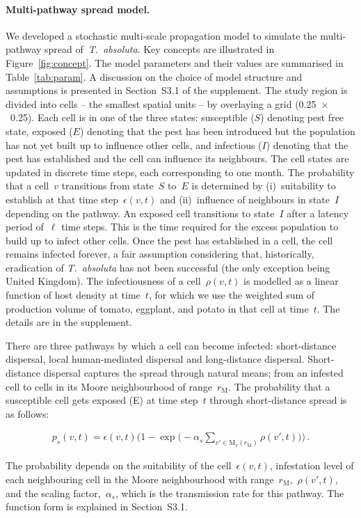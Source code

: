 \documentclass[11pt]{article}
\newcommand{\tuta}{\emph{T.~absoluta}}
\newcommand{\infest}{\rho}
\newcommand{\suitable}{\epsilon}
\newcommand{\pshort}{p_s}
\newcommand{\asd}{\alpha_s}
\newcommand{\moore}{\mathrm{M}}
\newcommand{\mooreRange}{r_\mathrm{M}}
\theoremstyle{definition}
\begin{document}
\paragraph{Multi-pathway spread model.} We developed a stochastic
multi-scale propagation model to simulate the multi-pathway spread
of~\tuta{}. Key concepts are illustrated in Figure~\ref{fig:concept}. The
model parameters and their values are summarised in Table~\ref{tab:param}.
A discussion on the choice of model structure and assumptions is presented
in Section~S3.1 of the supplement. The study region
is divided into cells -- the smallest spatial units -- by overlaying a grid
(0.25\textdegree~$\times$~0.25\textdegree). Each cell is in one of the
three states: susceptible ($S$) denoting pest free state, exposed ($E$)
denoting that the pest has been introduced but the population has not yet
built up to influence other cells, and infectious ($I$) denoting that the
pest has established and the cell can influence its neighbours. The cell
states are updated in discrete time steps, each corresponding to one month.
The probability that a cell~$v$ transitions from state~$S$ to~$E$ is
determined by (i)~suitability to establish at that time
step~$\suitable(v,t)$ and (ii)~influence of neighbours in state~$I$
depending on the pathway. An exposed cell transitions to state~$I$ after a
latency period of~$\ell$ time steps. This is the time required for the
excess population to build up to infect other cells. Once the pest has
established in a cell, the cell remains infected forever, a fair assumption
considering that, historically, eradication of \tuta{} has not been
successful (the only exception being United Kingdom). The infectiousness of
a cell~$\infest(v,t)$ is modelled as a linear function of host density at
time~$t$, for which we use the weighted sum of production volume of tomato,
eggplant, and potato in that cell at time~$t$. The details are in the
supplement.

There are three pathways by which a cell can become infected:
short-distance dispersal, local human-mediated dispersal and long-distance
dispersal. Short-distance dispersal captures the spread through natural
means; from an infested cell to cells in its Moore neighbourhood of
range~$\mooreRange$.  The probability that a susceptible cell gets exposed
(E) at time step~$t$ through short-distance spread is as follows:
\begin{linenomath}
\begin{align}\label{eqn:pshort}
    \pshort(v,t)=\suitable(v,t)\bigg(1-
    \exp\Big(-\asd\sum_{v'\in\moore_v(\mooreRange)}\infest(v',t)\Big)\bigg)\,.
\end{align}
\end{linenomath}
The probability depends on the suitability of the cell~$\suitable(v,t)$,
infestation level of each neighbouring cell in the Moore neighbourhood with
range~$\mooreRange$,~$\infest(v',t)$, and the scaling factor,~$\asd$, which
is the transmission rate for this pathway. The function form is explained
in Section~S3.1.
\end{document}
